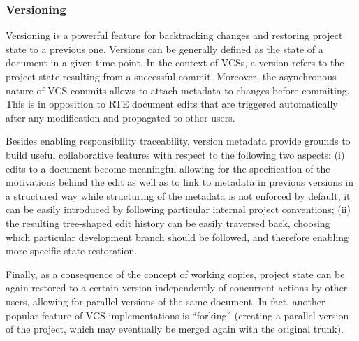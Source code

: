\documentclass{sig-alternate}
\begin{document}
\subsubsection{Versioning}\label{subsec:versioning}
Versioning is a powerful feature for backtracking changes and restoring project state to a
previous one. Versions can be generally defined as the state of a document in a given time point.
In the context of VCSs, a version refers to the project state resulting from a successful commit.
Moreover, the asynchronous nature of VCS commits allows to attach metadata to changes before
commiting. This is in opposition to RTE document edits that are triggered automatically
after any modification and propagated to other users.

Besides enabling responsibility traceability, version metadata provide grounds to build useful
collaborative features with respect to the following two aspects: (i) edits to a document become
meaningful allowing for the specification of the motivations behind the edit as well as to link
to metadata in previous versions in a structured way \textemdash while structuring of the metadata
is not enforced by default, it can be easily introduced by following particular internal project
conventions; (ii) the resulting tree-shaped edit history can be easily traversed back, choosing
which particular development branch should be followed, and therefore enabling more specific
state restoration.

Finally, as a consequence of the concept of working copies, project state can be again restored
to a certain version independently of concurrent actions by other users, allowing for parallel
versions of the same document. In fact, another popular feature of VCS implementations
is ``forking'' (creating a parallel version of the project, which may eventually be merged
again with the original trunk).


\end{document}
